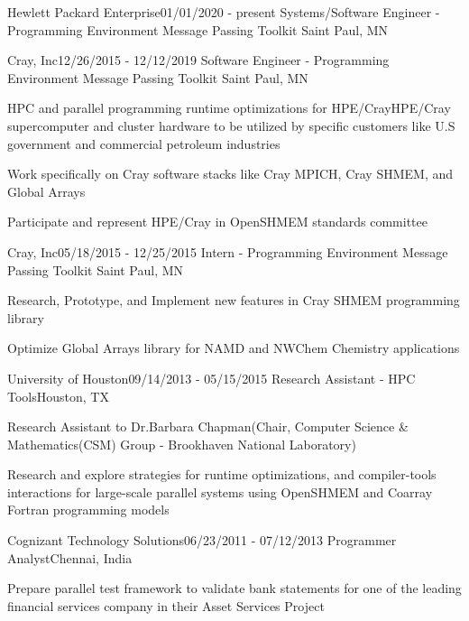 \begin{rSubsection}{Hewlett Packard Enterprise}{01/01/2020 - present}
                   {Systems/Software Engineer - Programming Environment Message Passing Toolkit}
                   {Saint Paul, MN}
\begin{rSubsection}{Cray, Inc}{12/26/2015 - 12/12/2019}
                   {Software Engineer - Programming Environment Message Passing Toolkit}
                   {Saint Paul, MN}
\item HPC and parallel programming runtime optimizations for HPE/CrayHPE/Cray supercomputer
      and cluster hardware to be utilized by specific customers like U.S
      government and commercial petroleum industries
\item Work specifically on Cray software stacks like Cray MPICH, Cray SHMEM, and
      Global Arrays
\item Participate and represent HPE/Cray in OpenSHMEM standards committee
\end{rSubsection}
\end{rSubsection}

\begin{rSubsection}{Cray, Inc}{05/18/2015 - 12/25/2015}
                   {Intern - Programming Environment Message Passing Toolkit}
                   {Saint Paul, MN}
\item Research, Prototype, and Implement new features in Cray SHMEM programming
      library
\item Optimize Global Arrays library for NAMD and NWChem Chemistry applications
\end{rSubsection}

\begin{rSubsection}{University of Houston}{09/14/2013 - 05/15/2015}
                   {Research Assistant - HPC Tools}{Houston, TX}
\item Research Assistant to Dr.Barbara Chapman(Chair, Computer Science
      \& Mathematics(CSM) Group - Brookhaven National Laboratory)
\item Research and explore strategies for runtime optimizations, and
      compiler-tools interactions for large-scale parallel systems using
      OpenSHMEM and Coarray Fortran programming models
\end{rSubsection}

\begin{rSubsection}{Cognizant Technology Solutions}{06/23/2011 - 07/12/2013}
                   {Programmer Analyst}{Chennai, India}
\item Prepare parallel test framework to validate bank statements for one of the leading
financial services company in their Asset Services Project
\end{rSubsection}
